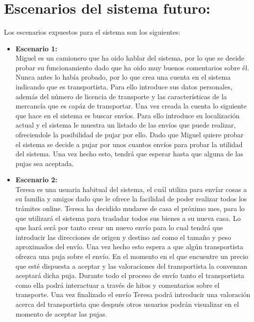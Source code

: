 \documentclass[10pt, a4paper,spanish]{article}
\begin{document}
	\section{Escenarios del sistema futuro:}

		\paragraph{}
		Los escenarios expuestos para el sistema son los siguientes:

		\begin{itemize}
			\item \textbf{Escenario 1:} \\
				Miguel es un camionero que ha oido hablar del sistema, por lo que se decide probar su funcionamiento dado que ha oido muy buenos comentarios sobre él. Nunca antes lo había probado, por lo que crea una cuenta en el sistema indicando que es transportista. Para ello introduce sus datos personales, además del número de licencia de transporte y las características de la mercancía que es capáz de transportar. Una vez creada la cuenta lo siguiente que hace en el sistema es buscar envíos. Para ello introduce su localización actual y el sistema le muestra un listado de las envíos que puede realizar, ofreciendole la posibilidad de pujar por ello. Dado que Miguel quiere probar el sistema se decide a pujar por unos cuantos envíos para probar la utilidad del sistema. Una vez hecho esto, tendrá que esperar hasta que alguna de las pujas sea aceptada.

			\item \textbf{Escenario 2:} \\
				Teresa es una usuaria habitual del sistema, el cuál utiliza para envíar cosas a su familia y amigos dado que le ofrece la facilidad de poder realizar todos los trámites online. Teresa ha decidido mudarse de casa el próximo mes, para lo que utilizará el sistema para trasladar todos sus bienes a su nueva casa. Lo que hará será por tanto crear un nuevo envío para lo cual tendrá que introducir las direcciones de origen y destino así como el tamaño y peso aproximados del envío. Una vez hecho esto espera a que algún transportista ofrezca una puja sobre el envío. En el momento en el que encuentre un precio que esté dispuesta a aceptar y las valoraciones del transportista la convenzan aceptará dicha puja. Durante todo el proceso de envío tanto el transportista como ella podrá interactuar a través de hitos y comentarios sobre el transporte. Una vez finalizado el envío Teresa podrá introducir una valoración acerca del transportista que después otros usuarios podrán visualizar en el momento de aceptar las pujas.


\end{itemize}
\end{document}
